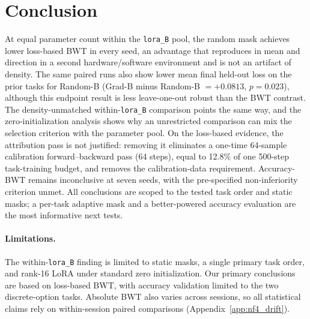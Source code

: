\section{Conclusion}
\label{sec:conclusion}

At equal parameter count within the \texttt{lora\_B} pool, the random mask achieves lower loss-based BWT in every seed, an advantage that reproduces in mean and direction in a second hardware/software environment and is not an artifact of density. The same paired runs also show lower mean final held-out loss on the prior tasks for Random-B (Grad-B minus Random-B $=+0.0813$, $p=0.023$), although this endpoint result is less leave-one-out robust than the BWT contrast. The density-unmatched within-\texttt{lora\_B} comparison points the same way, and the zero-initialization analysis shows why an unrestricted comparison can mix the selection criterion with the parameter pool. On the loss-based evidence, the attribution pass is not justified: removing it eliminates a one-time 64-sample calibration forward--backward pass (64 steps), equal to 12.8\% of one 500-step task-training budget, and removes the calibration-data requirement. Accuracy-BWT remains inconclusive at seven seeds, with the pre-specified non-inferiority criterion unmet. All conclusions are scoped to the tested task order and static masks; a per-task adaptive mask and a better-powered accuracy evaluation are the most informative next tests.

\paragraph{Limitations.}
\label{sec:limitations}

The within-\texttt{lora\_B} finding is limited to static masks,
a single primary task order, and rank-16 LoRA under standard
zero initialization. Our primary conclusions are based on loss-based
BWT, with accuracy validation limited to the two discrete-option tasks.
Absolute BWT also varies across sessions, so all statistical claims rely
on within-session paired comparisons (Appendix~\ref{app:nf4_drift}).
